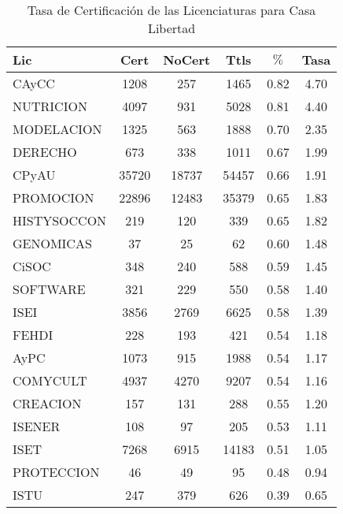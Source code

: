 \documentclass{article}
\begin{document}
\begin{table}[h]
\centering
\begin{tabular}{|l|cc|c|cc|}\hline\hline
Lic & Cert & NoCert & Ttls & $\%$ & Tasa \\\hline\hline
CAyCC & 1208 & 257 & 1465 & 0.82 & 4.70 \\
NUTRICION & 4097 & 931 & 5028 & 0.81 & 4.40 \\\hline\hline
MODELACION & 1325 & 563 & 1888 & 0.70 & 2.35 \\
DERECHO & 673 & 338 & 1011 & 0.67 & 1.99 \\
CPyAU & 35720 & 18737 & 54457 & 0.66 & 1.91 \\
PROMOCION & 22896 & 12483 & 35379 & 0.65 & 1.83 \\
HISTYSOCCON & 219 & 120 & 339 & 0.65 & 1.82 \\\hline\hline
GENOMICAS & 37 & 25 & 62 & 0.60 & 1.48 \\
CiSOC & 348 & 240 & 588 & 0.59 & 1.45 \\
SOFTWARE & 321 & 229 & 550 & 0.58 & 1.40 \\
ISEI & 3856 & 2769 & 6625 & 0.58 & 1.39 \\
FEHDI & 228 & 193 & 421 & 0.54 & 1.18 \\
AyPC & 1073 & 915 & 1988 & 0.54 & 1.17 \\
COMYCULT & 4937 & 4270 & 9207 & 0.54 & 1.16 \\
CREACION & 157 & 131 & 288 & 0.55 & 1.20 \\
ISENER & 108 & 97 & 205 & 0.53 & 1.11 \\
ISET & 7268 & 6915 & 14183 & 0.51 & 1.05 \\\hline\hline
PROTECCION & 46 & 49 & 95 & 0.48 & 0.94 \\
ISTU & 247 & 379 & 626 & 0.39 & 0.65 \\\hline\hline
\end{tabular}
\caption{Tasa de Certificación de las Licenciaturas para Casa Libertad}
\end{table}
\end{document}
